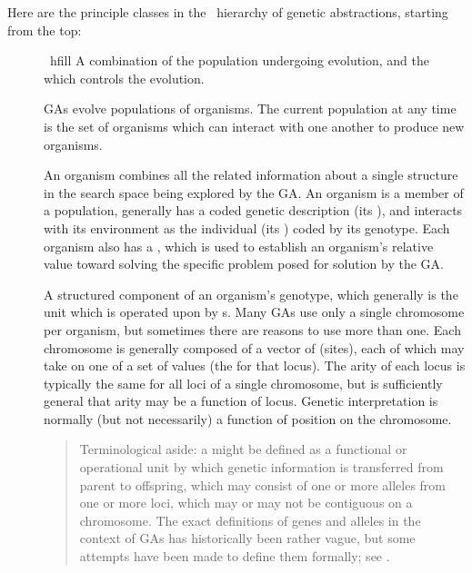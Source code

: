 Here are the principle classes in the \geco\ hierarchy of genetic 
abstractions, starting from the top:
{\samepage
\begin{description}
	\item []\ hfill \break
	A combination of the population
	undergoing evolution, and the  which controls the evolution.

	\item [] \hfill \break
	GAs evolve populations of
	organisms.  The current population at any time is the set of organisms
	which can interact with one another to produce new organisms.
	
    \item [] \hfill \break
    An organism combines all the related information
    about a single structure in the search space being explored by the
    GA. An organism is a member of a population, generally has a
    coded genetic description (its ), and interacts with
    its environment as the individual (its ) coded by
    its genotype. Each organism also has a , which is used to
    establish an organism's relative value toward solving the specific
    problem posed for solution by the GA.

	\item [] \hfill \break
	A structured component of an
	organism's genotype, which generally is the unit which is operated upon
	by s. Many GAs 
	use only a single chromosome per organism, but sometimes there are reasons to
	use more than one. Each chromosome is generally composed of a vector of
	 (sites), each of which may take on one of a set of values (the
	 for that locus). The arity of each locus is typically the
	same for all loci of a single chromosome, but \geco is sufficiently general
	that arity may be a function of locus. Genetic interpretation is normally (but not
	necessarily) a function of position on the chromosome. 
   \begin{quote}
		Terminological aside:
		a  might be defined as a functional or operational unit by which
		genetic information is transferred from parent to offspring, which may
		consist of one or more alleles from one or more loci, which may or may not be
		contiguous on a chromosome. The exact definitions of genes and alleles in the context
		of GAs has historically been rather vague, but some attempts have been
		made to define them formally; see \cite{ga:radcliffe92-11,ga:radcliffe92-04}.
   \end{quote}
\end{description}
}%


